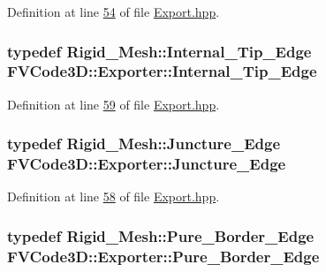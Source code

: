 Definition at line \hyperlink{Export_8hpp_source_l00054}{54} of file \hyperlink{Export_8hpp_source}{Export.\+hpp}.

\subsubsection[{\texorpdfstring{Internal\+\_\+\+Tip\+\_\+\+Edge}{Internal_Tip_Edge}}]{\setlength{\rightskip}{0pt plus 5cm}typedef {\bf Rigid\+\_\+\+Mesh\+::\+Internal\+\_\+\+Tip\+\_\+\+Edge} {\bf F\+V\+Code3\+D\+::\+Exporter\+::\+Internal\+\_\+\+Tip\+\_\+\+Edge}}\hypertarget{classFVCode3D_1_1Exporter_a7d2120b3d975d2a1cc43f663adc2583e}{}\label{classFVCode3D_1_1Exporter_a7d2120b3d975d2a1cc43f663adc2583e}


Definition at line \hyperlink{Export_8hpp_source_l00059}{59} of file \hyperlink{Export_8hpp_source}{Export.\+hpp}.

\subsubsection[{\texorpdfstring{Juncture\+\_\+\+Edge}{Juncture_Edge}}]{\setlength{\rightskip}{0pt plus 5cm}typedef {\bf Rigid\+\_\+\+Mesh\+::\+Juncture\+\_\+\+Edge} {\bf F\+V\+Code3\+D\+::\+Exporter\+::\+Juncture\+\_\+\+Edge}}\hypertarget{classFVCode3D_1_1Exporter_adae7aeb832ef13bceb9cd00987ac63d1}{}\label{classFVCode3D_1_1Exporter_adae7aeb832ef13bceb9cd00987ac63d1}


Definition at line \hyperlink{Export_8hpp_source_l00058}{58} of file \hyperlink{Export_8hpp_source}{Export.\+hpp}.

\subsubsection[{\texorpdfstring{Pure\+\_\+\+Border\+\_\+\+Edge}{Pure_Border_Edge}}]{\setlength{\rightskip}{0pt plus 5cm}typedef {\bf Rigid\+\_\+\+Mesh\+::\+Pure\+\_\+\+Border\+\_\+\+Edge} {\bf F\+V\+Code3\+D\+::\+Exporter\+::\+Pure\+\_\+\+Border\+\_\+\+Edge}}\hypertarget{classFVCode3D_1_1Exporter_a8ba1ca5b3f60e4934f9854273df002ce}{}\label{classFVCode3D_1_1Exporter_a8ba1ca5b3f60e4934f9854273df002ce}


